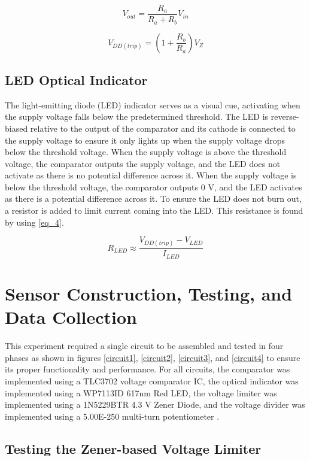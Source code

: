 \documentclass[conference]{IEEEtran}
\begin{document}
\begin{equation}
V_{out} = \frac{R_a}{R_a + R_b} V_{in}\label{eq_2}
\end{equation}

\begin{equation}
V_{DD(trip)} = (1 + \frac{R_b}{R_a})V_{Z}\label{eq_3}
\end{equation}

\subsection{LED Optical Indicator}

The light-emitting diode (LED) indicator serves as a visual cue, activating when the supply voltage falls below the predetermined threshold. The LED is reverse-biased relative to the output of the comparator and its cathode is connected to the supply voltage to ensure it only lights up when the supply voltage drops below the threshold voltage. When the supply voltage is above the threshold voltage, the comparator outputs the supply voltage, and the LED does not activate as there is no potential difference across it. When the supply voltage is below the threshold voltage, the comparator outputs 0 V, and the LED activates as there is a potential difference across it. To ensure the LED does not burn out, a resistor is added to limit current coming into the LED. This resistance is found by using \eqref{eq_4}.

\begin{equation}
R_{LED} \approx \frac{V_{DD(trip)} - V_{LED}}{I_{LED}}\label{eq_4}
\end{equation}

\section{Sensor Construction, Testing, and Data Collection}

This experiment required a single circuit to be assembled and tested in four phases as shown in figures \ref{circuit1}, \ref{circuit2},  \ref{circuit3}, and \ref{circuit4} to ensure its proper functionality and performance. For all circuits, the comparator was implemented using a TLC3702 voltage comparator IC, the optical indicator was implemented using a WP7113ID 617nm Red LED, the voltage limiter was implemented using a 1N5229BTR 4.3 V Zener Diode, and the voltage divider was implemented using a 5.00E-250 multi-turn potentiometer \cite{parts}.

\subsection{Testing the Zener-based Voltage Limiter}
\end{document}
